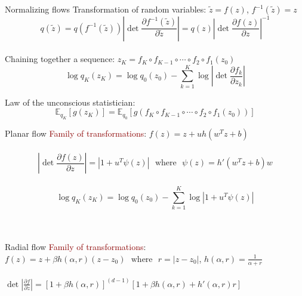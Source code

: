 \documentclass[unicode,11pt]{beamer}
\begin{document}
\begin{frame}[fragile]{Normalizing flows}
  Transformation of random variables: $\tilde{z} = f(z)$, $f^{-1}(\tilde{z}) = z$\\
  $$
  q(\tilde{z})
  = q(f^{-1}(\tilde{z})) \left\vert \det \frac{\partial f^{-1}(\tilde{z})}{\partial \tilde{z}} \right\vert
  = q(z) \left\vert \det \frac{\partial f(z)}{\partial z} \right\vert^{-1}
  $$ \\
  Chaining together a sequence: $z_K = f_K \circ f_{K−1} \circ \cdots \circ f_2 \circ f_1(z_0)$\\
  $$\log q_K(z_K) = \log q_0(z_0) − \sum_{k=1}^K \log \left\vert \det \frac{\partial f_k}{\partial z_k} \right\vert $$

  Law of the unconscious statistician:\\
  $$\mathbb{E}_{q_K} \left[g(z_K)\right] = \mathbb{E}_{q_0} \left[ g(f_K \circ f_{K−1} \circ \cdots \circ f_2
  \circ f_1(z_0)) \right] $$
\end{frame}

\begin{frame}[fragile]{Planar flow}
  \textcolor{darkred}{Family of transformations}: $f(z) = z + uh\left( w^T z + b \right)$\\
  ~\\
  $$\left\vert \det \frac{\partial f(z)}{\partial z} \right\vert = \left\vert 1 + u^T \psi(z)
  \right\vert ~~~\text{where}~~~ \psi(z) = h'(w^Tz + b)w$$ \\
  $$\log q_K(z_K) = \log q_0(z_0) − \sum_{k=1}^K \log \left\vert 1 + u^T \psi(z) \right\vert $$\\
  ~\\

\end{frame}

\begin{frame}[fragile]{Radial flow}
  \textcolor{darkred}{Family of transformations}: \\
  $f(z) = z + \beta h(\alpha, r)(z-z_0) ~~~\text{where}~~~ r = \vert z-z_0 \vert$,
  $h(\alpha, r) = \frac{1}{\alpha + r}$\\
  ~\\
  $\det \left\vert \frac{\partial f}{\partial z} \right\vert = [1 + \beta h(\alpha, r)]^{(d-1)}
  [1 + \beta h(\alpha, r) + h'(\alpha, r) r]$\\
  ~\\

\end{frame}
\end{document}
